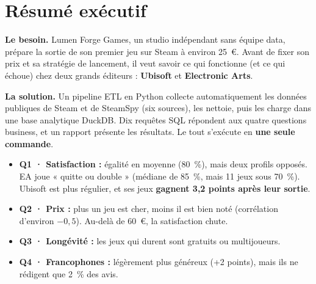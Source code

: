 \documentclass[11pt, a4paper, oneside, headings=normal, numbers=noenddot, DIV=12]{scrartcl}
\begin{document}
\begingroup
{}
\setcounter{tocdepth}{2}
\tableofcontents
\endgroup
\clearpage

\section{Résumé exécutif}\label{sec:resume}

\textbf{Le besoin.} Lumen Forge Games, un studio indépendant sans équipe data, prépare la sortie de son premier jeu sur Steam
à environ 25~€. Avant de fixer son prix et sa stratégie de lancement, il veut savoir ce qui fonctionne
(et ce qui échoue) chez deux grands éditeurs : \textbf{Ubisoft} et \textbf{Electronic Arts}.

\textbf{La solution.} Un pipeline ETL en Python collecte automatiquement les données publiques de Steam et de SteamSpy
(six sources), les nettoie, puis les charge dans une base analytique DuckDB. Dix requêtes SQL répondent aux quatre
questions business, et un rapport présente les résultats. Le tout s'exécute en \textbf{une seule commande}.


\begin{keybox}
\begin{itemize}[leftmargin=1.2em]
  \item \textbf{Q1 · Satisfaction :} égalité en moyenne (80~\%), mais deux profils opposés. EA joue « quitte ou double »
        (médiane de 85~\%, mais 11 jeux sous 70~\%). Ubisoft est plus régulier, et ses jeux \textbf{gagnent 3,2 points après leur sortie}.
  \item \textbf{Q2 · Prix :} plus un jeu est cher, moins il est bien noté (corrélation d'environ $-0{,}5$). Au-delà de 60~€, la satisfaction chute.
  \item \textbf{Q3 · Longévité :} les jeux qui durent sont gratuits ou multijoueurs.
  \item \textbf{Q4 · Francophones :} légèrement plus généreux (+2 points), mais ils ne rédigent que 2~\% des avis.
\end{itemize}
\end{keybox}
\end{document}
